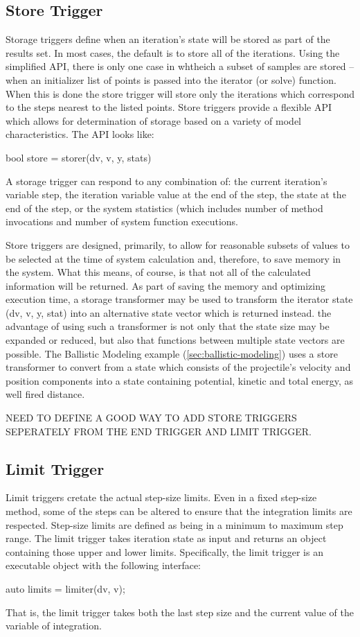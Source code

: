 \documentclass[letterpaper,10pt]{book}
\begin{document}
      \subsection{Store Trigger}
	Storage triggers define when an iteration's state will be stored as part of the results set.  In most cases, the default is to store all of the iterations.  Using the simplified API, there is only one case in whtheich a subset of samples are stored -- when an initializer list of points is passed into the iterator (or solve) function.  When this is done the store trigger will store only the iterations which correspond to the steps nearest to the listed points.  Store triggers provide a flexible API which allows for determination of storage based on a variety of model characteristics.  The API looks like:
	\begin{epodecode}
	  bool store = storer(dv, v, y, stats)
	\end{epodecode}
	A storage trigger can respond to any combination of: the current iteration's variable step, the iteration variable value at the end of the step, the state at the end of the step, or the system statistics (which includes number of method invocations and number of system function executions.
	
	Store triggers are designed, primarily, to allow for reasonable subsets of values to be selected at the time of system calculation and, therefore, to save memory in the system.  What this means, of course, is that not all of the calculated information will be returned.  As part of saving the memory and optimizing execution time, a storage transformer may be used to transform the iterator state (dv, v, y, stat) into an alternative state vector which is returned instead.  the advantage of using such a transformer is not only that the state size may be expanded or reduced, but also that functions between multiple state vectors are possible.  The Ballistic Modeling example (\ref{sec:ballistic-modeling}) uses a store transformer to convert from a state which consists of the projectile's velocity and position components into a state containing potential, kinetic and total energy, as well fired distance.
	
	NEED TO DEFINE A GOOD WAY TO ADD STORE TRIGGERS SEPERATELY FROM THE END TRIGGER AND LIMIT TRIGGER.

	
      \subsection{Limit Trigger}
	Limit triggers cretate the actual step-size limits.  Even in a fixed step-size method, some of the steps can be altered to ensure that the integration limits are respected. Step-size limits are defined as being in a minimum to maximum step range.  The limit trigger takes iteration state as input and returns an object containing those upper and lower limits.  Specifically, the limit trigger is an executable object with the following interface:
	\begin{epodecode}
	  auto limits = limiter(dv, v);
	\end{epodecode}
	That is, the limit trigger takes both the last step size and the current value of the variable of integration.
	
\end{document}
